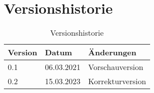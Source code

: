 \section*{Versionshistorie}

\begin{table}[ht]
  \centering
  \begin{tabular}{|l|l|l|}
    \hline
    \textbf{Version} & \textbf{Datum} & \textbf{Änderungen} \\ \hline
    0.1              & 06.03.2021     & Vorschauversion     \\ \hline
    0.2              & 15.03.2023     & Korrekturversion    \\ \hline
  \end{tabular}
  \caption{Versionshistorie}
  \label{tab:versionshistorie}
\end{table}